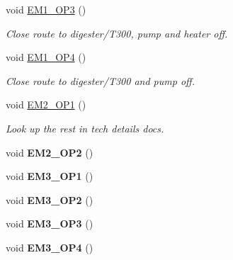 \begin{DoxyCompactItemize}
void \hyperlink{class_a_s_e6030_1_1_controller_ada67e644ad325022d583ccb45c8bc979}{E\+M1\+\_\+\+O\+P3} ()
\begin{DoxyCompactList}\small\item\em Close route to digester/\+T300, pump and heater off. \end{DoxyCompactList}\item 
\mbox{\label{class_a_s_e6030_1_1_controller_a1a77c72e15f8e4341864266e1c883dc8}} 
void \hyperlink{class_a_s_e6030_1_1_controller_a1a77c72e15f8e4341864266e1c883dc8}{E\+M1\+\_\+\+O\+P4} ()
\begin{DoxyCompactList}\small\item\em Close route to digester/\+T300 and pump off. \end{DoxyCompactList}\item 
\mbox{\label{class_a_s_e6030_1_1_controller_a3ee9ee83a0799f1c45edd53914b22f27}} 
void \hyperlink{class_a_s_e6030_1_1_controller_a3ee9ee83a0799f1c45edd53914b22f27}{E\+M2\+\_\+\+O\+P1} ()
\begin{DoxyCompactList}\small\item\em Look up the rest in tech details docs. \end{DoxyCompactList}\item 
\mbox{\label{class_a_s_e6030_1_1_controller_a9f8e1bba080881b98fdd0d928316cfe9}} 
void {\bfseries E\+M2\+\_\+\+O\+P2} ()
\item 
\mbox{\label{class_a_s_e6030_1_1_controller_a1f6f13495bcc83ae3bf46de1b1310a9b}} 
void {\bfseries E\+M3\+\_\+\+O\+P1} ()
\item 
\mbox{\label{class_a_s_e6030_1_1_controller_a64848ea464607f95e91b1da92adc1aeb}} 
void {\bfseries E\+M3\+\_\+\+O\+P2} ()
\item 
\mbox{\label{class_a_s_e6030_1_1_controller_a92b515c30c2599a8bf3e796bba73b9ce}} 
void {\bfseries E\+M3\+\_\+\+O\+P3} ()
\item 
\mbox{\label{class_a_s_e6030_1_1_controller_a1a58465612fe09ca1edd010f462f156c}} 
void {\bfseries E\+M3\+\_\+\+O\+P4} ()

\end{DoxyCompactItemize}

